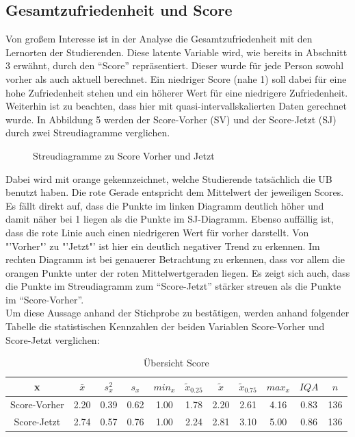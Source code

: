 \documentclass[11pt, a4paper]{article}
\begin{document}
\newpage

\subsection{Gesamtzufriedenheit und Score}



Von großem Interesse ist in der Analyse die Gesamtzufriedenheit mit den Lernorten der Studierenden.
Diese latente Variable wird, wie bereits in Abschnitt 3 erwähnt, durch den “Score” repräsentiert. Dieser wurde für jede Person sowohl vorher als auch aktuell berechnet.
Ein niedriger Score (nahe 1) soll dabei für eine hohe Zufriedenheit stehen und ein höherer Wert für eine niedrigere Zufriedenheit.\\
Weiterhin ist zu beachten, dass hier mit quasi-intervallskalierten Daten gerechnet wurde.
In Abbildung 5 werden der Score-Vorher (SV) und der Score-Jetzt (SJ) durch zwei Streudiagramme verglichen.

\vspace{-0.5cm}
\begin{figure}[h]

\vspace{-1.8cm}
\caption{Streudiagramme zu Score Vorher und Jetzt}
\vspace{1cm}
\end{figure}
Dabei wird mit orange gekennzeichnet, welche Studierende tatsächlich die UB benutzt haben. Die rote Gerade entspricht dem Mittelwert der jeweiligen Scores.
Es fällt direkt auf, dass die Punkte im linken Diagramm deutlich höher und damit näher bei 1 liegen als die Punkte im SJ-Diagramm.
Ebenso auffällig ist, dass die rote Linie auch einen niedrigeren Wert für vorher darstellt.
Von "'Vorher"' zu "'Jetzt"' ist hier ein deutlich negativer Trend zu erkennen.
Im rechten Diagramm ist bei genauerer Betrachtung zu erkennen, dass vor allem die orangen Punkte unter der roten Mittelwertgeraden liegen.
Es zeigt sich auch, dass die Punkte im Streudiagramm zum “Score-Jetzt” stärker streuen als die Punkte im “Score-Vorher”.\\
Um diese Aussage anhand der Stichprobe zu bestätigen, werden anhand folgender Tabelle die statistischen Kennzahlen der beiden Variablen Score-Vorher und Score-Jetzt verglichen: 



\begin{table}[h]
	\begin{center}
	\vspace{0.2cm}
	\begin{tabular}{c|ccccccccc|c}
		x & $\bar{x}$ & $s_x^2$ & $s_x$ & $min_x$ & $\tilde{x}_{0.25}$ & $\tilde{x}$ & $\tilde{x}_{0.75}$ & $max_x$ & $IQA$ & $n$ \\ \hline
		Score-Vorher & 2.20 & 0.39 & 0.62 & 1.00 & 1.78 & 2.20 & 2.61 & 4.16 & 0.83 & 136 \\
		Score-Jetzt & 2.74 & 0.57 & 0.76 & 1.00 & 2.24 & 2.81 & 3.10 & 5.00 & 0.86 & 136
	\end{tabular}
	\vspace{0.2cm}
	\caption{Übersicht Score}
\end{center}
\end{table}
\end{document}
